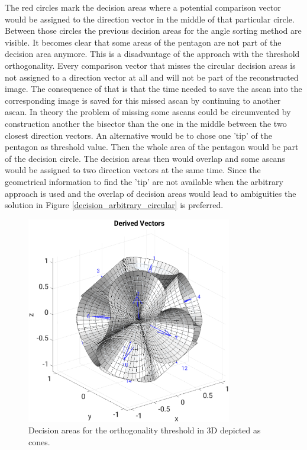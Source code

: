 The red circles mark the decision areas where a potential comparison vector would be assigned to the direction vector in the middle of that particular circle. Between those circles the previous decision areas for the angle sorting method are visible. It becomes clear that some areas of the pentagon are not part of the decision area anymore. This is a disadvantage of the approach with the threshold orthogonality. Every comparison vector that misses the circular decision areas is not assigned to a direction vector at all and will not be part of the reconstructed image.
The consequence of that is that the time needed to save the \ac{ascan} into the corresponding image is saved for this missed \ac{ascan} by continuing to another \ac{ascan}. In theory the problem of missing some \acp{ascan} could be circumvented by construction another the bisector than the one in the middle between the two closest direction vectors.
An alternative would be to chose one 'tip' of the pentagon as threshold value. Then the whole area of the pentagon would be part of the decision circle. The decision areas then would overlap and some \acp{ascan} would be assigned to two direction vectors at the same time. Since the geometrical information to find the 'tip' are not available when the arbitrary approach is used and the overlap of decision areas would lead to ambiguities the solution in Figure \ref{decision_arbitrary_circular} is preferred. 


\begin{figure}[H]
    \centering
    \includegraphics[width=0.8\textwidth]{Graphics/decision_cones.eps}
    \caption{Decision areas for the orthogonality threshold in 3D depicted as cones.}
    \label{figdecisioncones}
\end{figure}


